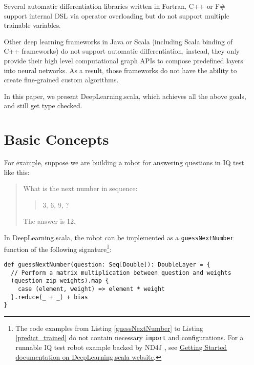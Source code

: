Several automatic differentiation libraries \cite{bischof1992adifor,griewank1996algorithm,TapenadeRef13,baydin2015diffsharp} written in Fortran, C++ or F\# support internal DSL via operator overloading but do not support multiple trainable variables.

Other deep learning frameworks in Java or Scala (including Scala binding of C++ frameworks) \cite{intel2016bigdl,skymind2017deeplearning4j,baydin2016hype,chen2017typesafe} do not support automatic differentiation, instead, they only provide their high level \gls{computational graph} APIs to compose predefined layers into neural networks. As a result, those frameworks do not have the ability to create fine-grained custom algorithms.

In this paper, we present DeepLearning.scala, which achieves all the above goals, and still get type checked.

\section{Basic Concepts\label{concepts}}

For example, suppose we are building a robot for answering questions in IQ test like this:

\begin{quote}
  What is the next number in sequence:
    \begin{quote}
    3, 6, 9, ?
    \end{quote}
  The answer is 12.
\end{quote}

In DeepLearning.scala, the robot can be implemented as a \lstinline{guessNextNumber} function of the following signature\footnote{The code examples from Listing \ref{guessNextNumber} to Listing \ref{predict_trained} do not contain necessary \lstinline{import} and configurations. For a runnable IQ test robot example backed by ND4J \cite{skymind2017nd4j}, see \href{http://deeplearning.thoughtworks.school/demo/GettingStarted.html}{Getting Started documentation on DeepLearning.scala website}.}:

\begin{lstlisting}[float={htbp},caption={The differentiable matrix multiplication implemented by \lstinline{map}/\lstinline{reduce}},label={guessNextNumber}]
def guessNextNumber(question: Seq[Double]): DoubleLayer = {
  // Perform a matrix multiplication between question and weights
  (question zip weights).map {
    case (element, weight) => element * weight
  }.reduce(_ + _) + bias
}
\end{lstlisting}

